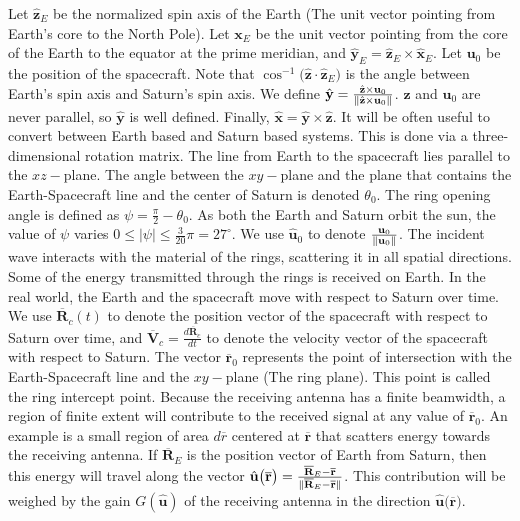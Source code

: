 \documentclass[oneside]{book}
\theoremstyle{mystyle}
\DeclarePairedDelimiter\norm{\lVert}{\rVert}
\begin{document}
\noindent Let $\hat{\mathbf{z}}_{E}$ be the normalized spin axis of the Earth (The unit vector pointing from Earth's core to the North Pole). Let $\mathbf{x}_{E}$ be the unit vector pointing from the core of the Earth to the equator at the prime meridian, and $\hat{\mathbf{y}}_{E} = \hat{\mathbf{z}}_{E}\times \hat{\mathbf{x}}_{E}$. Let $\mathbf{u}_{0}$ be the position of the spacecraft. Note that $\cos^{-1}\big(\hat{\mathbf{z}}\cdot\hat{\mathbf{z}}_{E}\big)$ is the angle between Earth's spin axis and Saturn's spin axis. We define $\hat{\mathbf{y}} = \frac{\hat{\mathbf{z}}\times \mathbf{u}_{0}}{\norm{\hat{\mathbf{z}}\times \mathbf{u}_{0}}}$. $\hat{\mathbf{z}}$ and $\mathbf{u}_{0}$ are never parallel, so $\hat{\mathbf{y}}$ is well defined. Finally, $\hat{\mathbf{x}} = \hat{\mathbf{y}}\times \hat{\mathbf{z}}$. It will be often useful to convert between Earth based and Saturn based systems. This is done via a three-dimensional rotation matrix. The line from Earth to the spacecraft lies parallel to the $xz-$plane. The angle between the $xy-$plane and the plane that contains the Earth-Spacecraft line and the center of Saturn is denoted $\theta_{0}$. The ring opening angle is defined as $\psi = \frac{\pi}{2} - \theta_{0}$. As both the Earth and Saturn orbit the sun, the value of $\psi$ varies $0\leq |\psi| \leq \frac{3}{20}\pi = 27^{\circ}$. We use $\hat{\mathbf{u}}_{0}$ to denote $\frac{\mathbf{u}_{0}}{\norm{\mathbf{u}_{0}}}$. The incident wave interacts with the material of the rings, scattering it in all spatial directions. Some of the energy transmitted through the rings is received on Earth. In the real world, the Earth and the spacecraft move with respect to Saturn over time. We use $\overline{\mathbf{R}}_{c}(t)$ to denote the position vector of the spacecraft with respect to Saturn over time, and $\overline{\mathbf{V}}_{c} = \frac{d \overline{\mathbf{R}}_{c}}{dt}$ to denote the velocity vector of the spacecraft with respect to Saturn. The vector $\overline{\mathbf{r}}_{0}$ represents the point of intersection with the Earth-Spacecraft line and the $xy-$plane (The ring plane). This point is called the ring intercept point. Because the receiving antenna has a finite beamwidth, a region of finite extent will contribute to the received signal at any value of $\overline{\mathbf{r}}_{0}$. An example is a small region of area $d\overline{r}$ centered at $\overline{\mathbf{r}}$ that scatters energy towards the receiving antenna. If $\overline{\mathbf{R}}_{E}$ is the position vector of Earth from Saturn, then this energy will travel along the vector $\hat{\mathbf{u}}\big(\overline{\mathbf{r}}\big) = \frac{\overline{\mathbf{R}}_{E}-\overline{\mathbf{r}}}{\norm{\overline{\mathbf{R}}_{E}-\overline{\mathbf{r}}}}$. This contribution will be weighed by the gain $G(\hat{\mathbf{u}})$ of the receiving antenna in the direction $\hat{\mathbf{u}}\big(\overline{\mathbf{r}}\big)$. 
\end{document}
